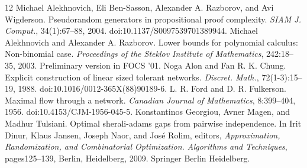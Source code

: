 \documentclass[10pt,a4paper]{article}
\begin{document}
\begin{thebibliography}{12}
 Michael Alekhnovich, Eli Ben-Sasson, Alexander A. Razborov, and Avi Wigderson. Pseudorandom generators in propositional proof complexity. \emph{SIAM J. Comput.}, 34(1):67--88, 2004. doi:10.1137/S0097539701389944.
 Michael Alekhnovich and Alexander A. Razborov. Lower bounds for polynomial calculus: Non-binomial case. \emph{Proceedings of the Steklov Institute of Mathematics}, 242:18--35, 2003. Preliminary version in FOCS '01.
 Noga Alon and Fan R. K. Chung. Explicit construction of linear sized tolerant networks. \emph{Discret. Math.}, 72(1-3):15--19, 1988. doi:10.1016/0012-365X(88)90189-6.
 L. R. Ford and D. R. Fulkerson. Maximal flow through a network. \emph{Canadian Journal of Mathematics}, 8:399--404, 1956. doi:10.4153/CJM-1956-045-5.
 Konstantinos Georgiou, Avner Magen, and Madhur Tulsiani. Optimal sherali-adams gaps from pairwise independence. In Irit Dinur, Klaus Jansen, Joseph Naor, and Jos\'e Rolim, editors, \emph{Approximation, Randomization, and Combinatorial Optimization. Algorithms and Techniques}, pages125--139, Berlin, Heidelberg, 2009. Springer Berlin Heidelberg.
\end{thebibliography}
\end{document}
